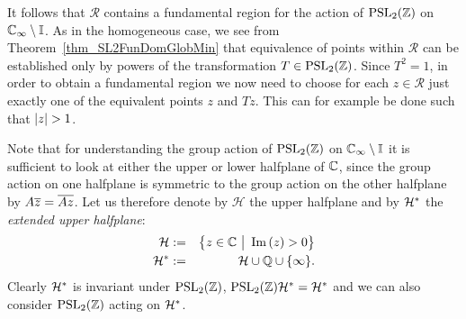 It follows that $\mathcal{R}$ contains a fundamental region for the action of $\operatorname{PSL}_{2}(\mathbb{Z})$ on $\mathbb{C}_{\infty} \setminus \mathbb{I}$. As in the homogeneous case, we see from Theorem~\ref{thm_SL2FunDomGlobMin} that equivalence of points within $\mathcal{R}$ can be established only by powers of the transformation $T \in \operatorname{PSL}_{2}(\mathbb{Z})$. Since $T^2 = 1$, in order to obtain a fundamental region we now need to choose for each $z \in \mathcal{R}$ just exactly one of the equivalent points $z$ and $Tz$. This can for example be done such that $\left|z\right| > 1$.

Note that for understanding the group action of $\operatorname{PSL}_{2}(\mathbb{Z})$ on $\mathbb{C}_{\infty} \setminus \mathbb{I}$ it is sufficient to look at either the upper or lower halfplane of $\mathbb{C}$, since the group action on one halfplane is symmetric to the group action on the other halfplane by $A\overline{z} = \overline{Az}$. Let us therefore denote by $\mathcal{H}$ the upper halfplane and by $\mathcal{H}^\ast$ the \emph{extended upper halfplane}:
\begin{eqnarray}
\label{eqn_UpperHalfplane}\mathcal{H} &:=& \big\{ z \in \mathbb{C} \ \big| \ \operatorname{Im}\left(z\right) > 0 \big\} \\
\label{eqn_ExtUpperHalfplane}
\mathcal{H}^\ast &:=& \mathcal{H} \cup \mathbb{Q} \cup \{\infty\}.
\end{eqnarray}
Clearly $\mathcal{H}^\ast$ is invariant under $\operatorname{PSL}_{2}(\mathbb{Z})$, \ie $\operatorname{PSL}_{2}(\mathbb{Z}) \mathcal{H}^\ast = \mathcal{H}^\ast$ and we can also consider $\operatorname{PSL}_{2}(\mathbb{Z})$ acting on $\mathcal{H}^\ast$.

